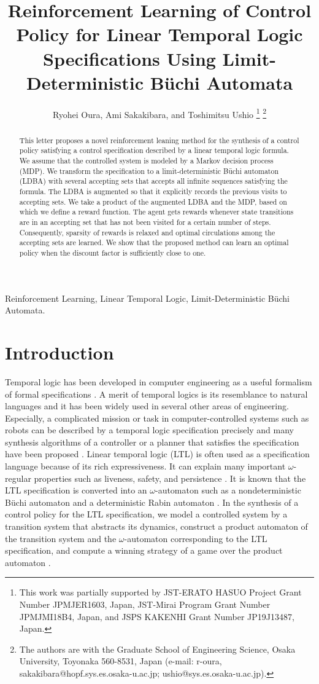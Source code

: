 \documentclass[letterpaper, 10 pt, conference]{ieeeconf}  %
\title{\LARGE \bf
Reinforcement Learning of Control Policy for Linear Temporal Logic Specifications Using Limit-Deterministic B\"{u}chi Automata
}
\author{Ryohei Oura, Ami Sakakibara, and Toshimitsu Ushio%
\thanks{This work was partially supported by JST-ERATO HASUO Project Grant Number JPMJER1603, Japan, JST-Mirai Program Grant Number JPMJMI18B4, Japan, and JSPS KAKENHI Grant Number JP19J13487, Japan.}%
\thanks{The authors are with the Graduate School of Engineering Science, Osaka University, Toyonaka 560-8531, Japan (e-mail: {r-oura, sakakibara}@hopf.sys.es.osaka-u.ac.jp; ushio@sys.es.osaka-u.ac.jp).}%
}
\begin{document}
\maketitle
\thispagestyle{empty}
\pagestyle{empty}

\begin{abstract}

This letter proposes a novel reinforcement leaning method for the synthesis of a control policy satisfying a control specification described by a linear temporal logic formula.  We assume that the controlled system is modeled by a Markov decision process (MDP).
We transform the specification to a limit-deterministic B\"{u}chi automaton (LDBA) with several accepting sets that accepts all infinite sequences satisfying the formula.
The LDBA is augmented so that it explicitly records the previous visits to accepting sets.
We take a product of the augmented LDBA and the MDP, based on which we define a reward function.  The agent gets rewards whenever state transitions are in an accepting set that has not been visited for a certain number of steps.
Consequently, sparsity of rewards is relaxed and optimal circulations among the accepting sets are learned. We show that the proposed method can learn an optimal policy when the discount factor is sufficiently close to one.
\end{abstract}

\begin{keywords}
  Reinforcement Learning, Linear Temporal Logic, Limit-Deterministic B\"{u}chi Automata.
\end{keywords}

\section{Introduction}
Temporal logic has been developed in computer engineering as a useful formalism of formal specifications  \cite{BK2008,Clarke2018}.
A merit of temporal logics is its resemblance to natural languages and it has been widely used in several other areas of engineering. Especially, a complicated mission or task in computer-controlled systems such as robots can be described by a temporal logic specification precisely and many synthesis algorithms of a controller or a planner that satisfies the specification have been proposed \cite{KB2008,Gazit2009,WTM2012a,SU2018}.
Linear temporal logic (LTL) is often used as a specification language because of its rich expressiveness.  It can explain many important $\omega$-regular properties such as liveness, safety, and persistence \cite{BK2008}.
It is known that the LTL specification is converted into an $\omega$-automaton such as a nondeterministic B\"{u}chi automaton and a deterministic Rabin automaton \cite{BK2008,Belta2017}.
In the synthesis of a control policy for the LTL specification,  we model a controlled system by a transition system that abstracts its dynamics, construct a product automaton of the transition system and the $\omega$-automaton corresponding to the LTL specification, and compute a winning strategy of a game over the product automaton \cite{Belta2017}.
\end{document}
